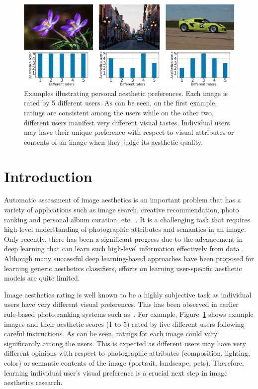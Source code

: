 \begin{figure}
\begin{center}
\includegraphics[width=1\columnwidth]{figures/demo1}
\end{center}
\caption{Examples illustrating personal aesthetic preferences. Each image is rated by 5 different users. As can be seen, on the first example, ratings are consistent among the users while on the other two, different users manifest very different visual tastes. Individual users may have their unique preference with respect to visual attributes or contents of an image when they judge its aesthetic quality.} 
\label{demoImage}
\end{figure}

\section{Introduction}

Automatic assessment of image aesthetics is an important problem that has a variety of applications such as image search, creative recommendation, photo ranking and personal album curation, etc.~\cite{marchesotti2015discovering, lu2015deep}. It is a challenging task that requires high-level understanding of photographic attributes and semantics in an image. Only recently, there has been a significant progress due to the advancement in deep learning that can learn such high-level information effectively from data \cite{lu2014rapid, lu2015deep}. Although many successful deep learning-based approaches have been proposed for learning generic aesthetics classifiers, efforts on learning user-specific aesthetic models are quite limited. 

Image aesthetics rating is well known to be a highly subjective task as individual users have very different visual preferences. This has been observed in earlier rule-based photo ranking systems such as~\cite{yeh2010personalized, yeh2014personalized, vessel2014personalized}.  
For example, Figure~\ref{demoImage} shows example images and their aesthetic scores (1 to 5) rated by five different users following careful instructions. As can be seen, ratings for each image could vary significantly among the users. This is expected as different users may have very different opinions with respect to photographic attributes (composition, lighting, color) or semantic contents of the image (portrait, landscape, pets). Therefore, learning individual user's visual preference is a crucial next step in image aesthetics research.  

